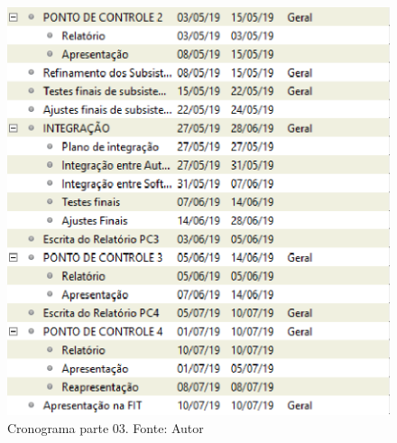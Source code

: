 \begin{apendicesenv}
\begin{figure}[ht]
    \centering
    \includegraphics[keepaspectratio=true,scale=1]{figuras/C3.eps}
    \caption[Cronograma parte 03.]{Cronograma parte 03. Fonte: Autor}
    \label{fig:cronograma3}
\end{figure}

\end{apendicesenv}
